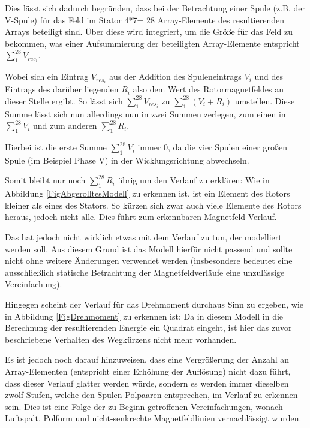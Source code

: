Dies lässt sich dadurch begründen, dass bei der Betrachtung einer Spule (z.B. der V-Spule) für das Feld im Stator 4*7= 28 Array-Elemente des resultierenden Arrays beteiligt sind. Über diese wird integriert, um die Größe für das Feld zu bekommen, was einer Aufsummierung der beteiligten Array-Elemente entspricht $\sum \limits_1^{28} V_{res_i}$. 

Wobei sich ein Eintrag $V_{res_i}$ aus der Addition des Spuleneintrags $V_i$ und des Eintrags des darüber liegenden $R_i$ also dem Wert des Rotormagnetfeldes an dieser Stelle ergibt. So lässt sich $\sum \limits_1^{28} V_{res_i}$ zu $\sum \limits_1^{28} (V_i+R_i)$ umstellen. Diese Summe lässt sich nun allerdings nun in zwei Summen zerlegen, zum einen in $\sum \limits_1^{28} V_i$ und zum anderen $\sum \limits_1^{28} R_i$. 

Hierbei ist die erste Summe  $\sum \limits_1^{28} V_i$ immer 0, da die vier Spulen einer großen Spule (im Beispiel Phase V) in der Wicklungsrichtung abwechseln. 

Somit bleibt nur noch $\sum \limits_1^{28} R_i$ übrig um den Verlauf zu erklären: Wie in Abbildung \ref{FigAbgerolltesModell} zu erkennen ist, ist ein Element des Rotors kleiner als eines des Stators. So kürzen sich zwar auch viele Elemente des Rotors heraus, jedoch nicht alle. Dies führt zum erkennbaren Magnetfeld-Verlauf. 

Das hat jedoch nicht wirklich etwas mit dem Verlauf zu tun, der modelliert werden soll. Aus diesem Grund ist das Modell hierfür nicht passend und sollte nicht ohne weitere Änderungen verwendet werden (insbesondere bedeutet eine ausschließlich statische Betrachtung der Magnetfeldverläufe eine unzulässige Vereinfachung).

Hingegen scheint der Verlauf für das Drehmoment durchaus Sinn zu ergeben, wie in Abbildung \ref{FigDrehmoment} zu erkennen ist: Da in diesem Modell in die Berechnung der resultierenden  Energie ein Quadrat eingeht, ist hier das zuvor beschriebene Verhalten des Wegkürzens nicht mehr vorhanden. 

Es ist jedoch noch darauf hinzuweisen, dass eine Vergrößerung der Anzahl an Array-Elementen (entspricht einer Erhöhung der Auflösung) nicht dazu führt, dass dieser Verlauf glatter werden würde, sondern es werden immer dieselben zwölf Stufen, welche den Spulen-Polpaaren entsprechen, im Verlauf zu erkennen sein.
Dies ist eine Folge der zu Beginn getroffenen Vereinfachungen, wonach Luftspalt, Polform und nicht-senkrechte Magnetfeldlinien vernachlässigt wurden.


